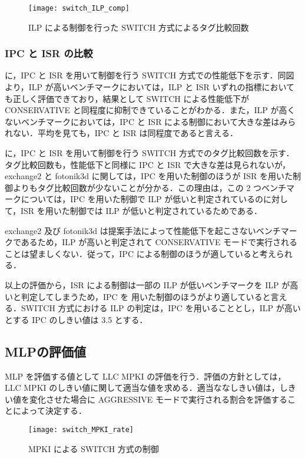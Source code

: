\begin{figure}[htb]
  \centering
  \texttt{[image: switch\_ILP\_comp]}
  \caption{ILP による制御を行った SWITCH 方式によるタグ比較回数}
  \label{fig:switch_ILP_comp}
\end{figure}

\subsubsection{IPC と ISR の比較}
に，IPC と ISR を用いて制御を行う SWITCH 方式での性能低下を示す．同図より，ILP が高いベンチマークにおいては，ILP と ISR いずれの指標においても正しく評価できており，結果として SWITCH による性能低下が CONSERVATIVE と同程度に抑制できていることがわかる．また，ILP が高くないベンチマークにおいては，IPC と ISR による制御において大きな差はみられない．平均を見ても，IPC と ISR は同程度であると言える．

に，IPC と ISR を用いて制御を行う SWITCH 方式でのタグ比較回数を示す．タグ比較回数も，性能低下と同様に IPC と ISR で大きな差は見られないが，exchange2 と fotonik3d に関しては，IPC を用いた制御のほうが ISR を用いた制御よりもタグ比較回数が少ないことが分かる．この理由は，この 2 つベンチマークについては，IPC を用いた制御で ILP が低いと判定されているのに対して，ISR を用いた制御では ILP が低いと判定されているためである．

exchange2 及び fotonik3d は提案手法によって性能低下を起こさないベンチマークであるため，ILP が高いと判定されて CONSERVATIVE モードで実行されることは望ましくない．従って，IPC による制御のほうが適していると考えられる．

以上の評価から，ISR による制御は一部の ILP が低いベンチマークを ILP が高いと判定してしまうため，IPC を 用いた制御のほうがより適していると言える．SWITCH 方式における ILP の判定は，IPC を用いることとし，ILP が高いとする IPC のしきい値は 3.5 とする．

\subsection{MLPの評価値}
MLP を評価する値として LLC MPKI の評価を行う．評価の方針としては，LLC MPKI のしきい値に関して適当な値を求める．適当ななしきい値は，しきい値を変化させた場合に AGGRESSIVE モードで実行される割合を評価することによって決定する．

\begin{figure}[htb]
  \centering
  \texttt{[image: switch\_MPKI\_rate]}
  \caption{MPKI による SWITCH 方式の制御}
  \label{fig:switch_MPKI_rate}
\end{figure}

